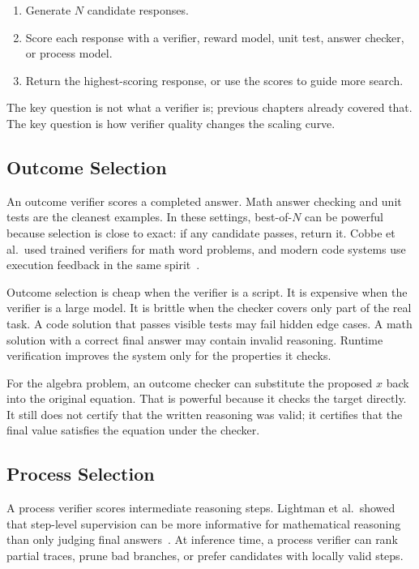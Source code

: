 \begin{enumerate}[nosep]
  \item Generate $N$ candidate responses.
  \item Score each response with a verifier, reward model, unit test, answer checker, or process model.
  \item Return the highest-scoring response, or use the scores to guide more search.
\end{enumerate}

The key question is not what a verifier is; previous chapters already covered that. The key question is how verifier quality changes the scaling curve.

\subsection{Outcome Selection}

An outcome verifier scores a completed answer. Math answer checking and unit tests are the cleanest examples. In these settings, best-of-$N$ can be powerful because selection is close to exact: if any candidate passes, return it. Cobbe et al.\ used trained verifiers for math word problems, and modern code systems use execution feedback in the same spirit~\cite{cobbe2021gsm8k}.

Outcome selection is cheap when the verifier is a script. It is expensive when the verifier is a large model. It is brittle when the checker covers only part of the real task. A code solution that passes visible tests may fail hidden edge cases. A math solution with a correct final answer may contain invalid reasoning. Runtime verification improves the system only for the properties it checks.

For the algebra problem, an outcome checker can substitute the proposed $x$ back into the original equation. That is powerful because it checks the target directly. It still does not certify that the written reasoning was valid; it certifies that the final value satisfies the equation under the checker.

\subsection{Process Selection}

A process verifier scores intermediate reasoning steps. Lightman et al.\ showed that step-level supervision can be more informative for mathematical reasoning than only judging final answers~\cite{lightman2023verify}. At inference time, a process verifier can rank partial traces, prune bad branches, or prefer candidates with locally valid steps.

